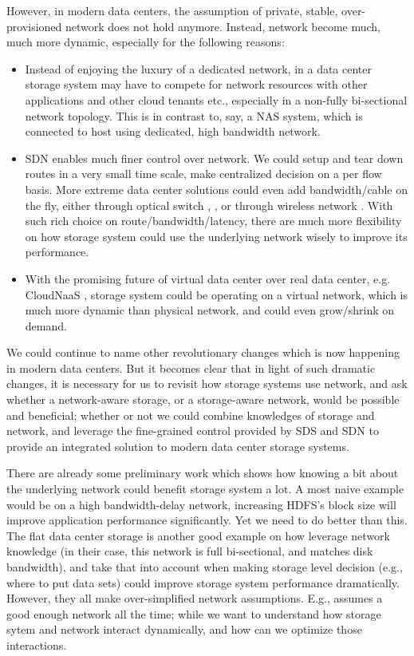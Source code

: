 However, in modern data centers, the assumption of private, stable, over-provisioned network does not hold anymore. Instead, network become much, much more dynamic, especially for the following reasons:


\begin{itemize}
\item{}
       	Instead of enjoying the luxury of a dedicated network, in a data center storage system may have to compete for network resources with other applications and other cloud tenants etc., especially in a non-fully bi-sectional network topology. This is in contrast to, say, a NAS system, which is connected to host using dedicated, high bandwidth network. 

\item {}
SDN enables much finer control over network. We could setup and tear down routes in a very small time scale, make centralized decision on a per flow basis. More extreme data center solutions could even add bandwidth/cable on the fly, either through optical switch \cite{c-through}, \cite{helios}, or through wireless network \cite{flyaways}. With such rich choice on route/bandwidth/latency, there are much more flexibility on how storage system could use the underlying network wisely to improve its performance.

\item {}
With the promising future of virtual data center over real data center, e.g. CloudNaaS \cite{cloudnaas}, storage system could be operating on a virtual network, which is much more dynamic than physical network, and could even grow/shrink on demand.

\end{itemize}

We could continue to name other revolutionary changes which is now happening in modern data centers. But it becomes clear that in light of such dramatic changes, it is necessary for us to revisit how storage systems use network, and ask whether a network-aware storage, or a storage-aware network, would be possible and beneficial; whether or not we could combine knowledges of storage and network, and leverage the fine-grained control provided by SDS and SDN to provide an integrated solution to modern data center storage systems.

There are already some preliminary work which shows how knowing a bit about the underlying network could benefit storage system a lot. A most naive example would be on a high bandwidth-delay network, increasing HDFS's block size will improve application performance significantly. 
Yet we need to do better than this. The flat data center storage \cite{flat-datacenter-storage} is another good example on how leverage network knowledge (in their case, this network is full bi-sectional, and matches disk bandwidth), and take that into account when making storage level decision (e.g., where to put data sets) could improve storage system performance dramatically. However, they all make over-simplified network assumptions. E.g., \cite{flat-datacenter-storage} assumes a good enough network all the time; while we want to understand how storage sytem and network interact dynamically, and how can we optimize those interactions.

